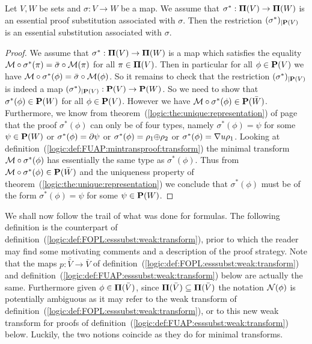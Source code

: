 \begin{prop}\label{logic:prop:FUAP:esssubst:proof:to:formula}
Let $V,W$ be sets and $\sigma:V\to W$ be a map. We assume that
$\sigma^{*}:\mbox{${\bf\Pi}(V)$}\to{\bf\Pi}(W)$ is an essential proof substitution
associated with $\sigma$. Then the restriction $(\sigma^{*})_{|{\bf
P}(V)}$ is an essential substitution associated with $\sigma$.
\end{prop}
\begin{proof}
We assume that $\sigma^{*}:\mbox{${\bf\Pi}(V)$}\to{\bf\Pi}(W)$ is a map which
satisfies the equality ${\cal
M}\circ\sigma^{*}(\pi)=\bar{\sigma}\circ{\cal M}(\pi)$ for all
$\pi\in\mbox{${\bf\Pi}(V)$}$. Then in particular for all $\phi\in\mbox{${\bf P}(V)$}$ we have ${\cal
M}\circ\sigma^{*}(\phi)=\bar{\sigma}\circ{\cal M}(\phi)$. So it
remains to check that the restriction $(\sigma^{*})_{|{\bf P}(V)}$
is indeed a map $(\sigma^{*})_{|{\bf P}(V)}:\mbox{${\bf P}(V)$}\to{\bf P}(W)$. So we
need to show that $\sigma^{*}(\phi)\in{\bf P}(W)$ for all
$\phi\in\mbox{${\bf P}(V)$}$. However we have ${\cal M}\circ\sigma^{*}(\phi)\in{\bf
P}(\bar{W})$. Furthermore, we know from
theorem~(\ref{logic:the:unique:representation}) of
page~\pageref{logic:the:unique:representation} that the proof
$\sigma^{*}(\phi)$ can only be of four types, namely
$\sigma^{*}(\phi)=\psi$ for some $\psi\in{\bf P}(W)$ or
$\sigma^{*}(\phi)=\mbox{$\partial$}\psi$ or
$\sigma^{*}(\phi)=\rho_{1}\mbox{$\oplus$}\rho_{2}$ or $\sigma^{*}(\phi)=\mbox{$\nabla$}
u\rho_{1}$. Looking at
definition~(\ref{logic:def:FUAP:mintransproof:transform}) the
minimal transform ${\cal M}\circ\sigma^{*}(\phi)$ has essentially
the same type as $\sigma^{*}(\phi)$. Thus from ${\cal
M}\circ\sigma^{*}(\phi)\in{\bf P}(\bar{W})$ and the uniqueness
property of theorem~(\ref{logic:the:unique:representation}) we
conclude that $\sigma^{*}(\phi)$ must be of the form
$\sigma^{*}(\phi)=\psi$ for some $\psi\in{\bf P}(W)$.
\end{proof}

We shall now follow the trail of what was done for formulas. The
following definition is the counterpart of
definition~(\ref{logic:def:FOPL:esssubst:weak:transform}), prior to
which the reader may find some motivating comments and a description
of the proof strategy. Note that the maps
$p:\bar{\bar{V}}\to\bar{V}$ of
definition~(\ref{logic:def:FOPL:esssubst:weak:transform}) and
definition~(\ref{logic:def:FUAP:esssubst:weak:transform}) below are
actually the same. Furthermore given $\phi\in\mbox{${\bf\Pi}(\bar{V})$}$, since
$\mbox{${\bf\Pi}(\bar{V})$}\subseteq\mbox{${\bf\Pi}(\bar{V})$}$ the notation ${\cal N}(\phi)$ is potentially
ambiguous as it may refer to the weak transform of
definition~(\ref{logic:def:FOPL:esssubst:weak:transform}), or to
this new weak transform for proofs of
definition~(\ref{logic:def:FUAP:esssubst:weak:transform}) below.
Luckily, the two notions coincide as they do for minimal transforms.

